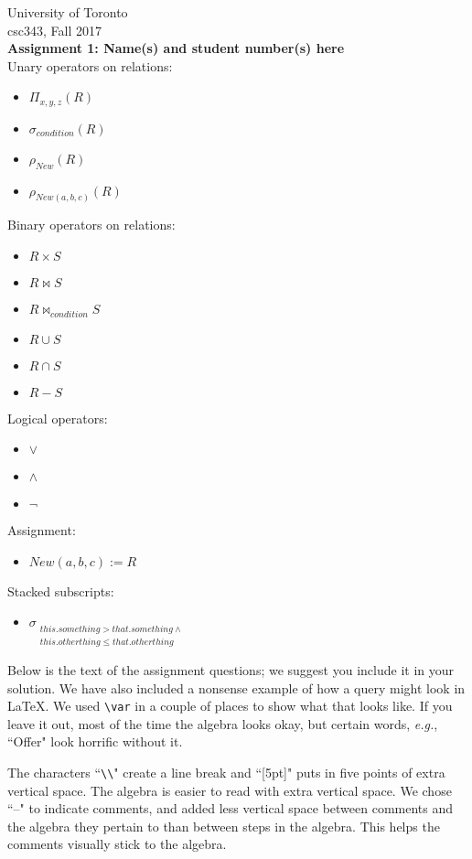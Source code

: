 \documentclass{article}
\newcommand{\var}[1]{\mathit{#1}}
\begin{document}
\noindent
University of Toronto\\
{\sc csc}343, Fall 2017\\[10pt]
{\LARGE\bf Assignment 1: Name(s) and student number(s) here} \\[10pt]

\noindent
Unary operators on relations:
\begin{itemize}
\item $\Pi_{x, y, z} (R)$
\item $\sigma_{condition} (R) $
\item $\rho_{New} (R) $
\item $\rho_{New(a, b, c)} (R) $
\end{itemize}
Binary operators on relations:
\begin{itemize}
\item $R \times S$
\item $R \bowtie S$
\item $R \bowtie_{condition} S$
\item $R \cup S$
\item $R \cap S$
\item $R - S$
\end{itemize}
Logical operators:
\begin{itemize}
\item $\vee$
\item $\wedge$
\item $\neg$
\end{itemize}
Assignment:
\begin{itemize}
\item $New(a, b, c) := R$
\end{itemize}
Stacked subscripts:
\begin{itemize}
\item
$\sigma_{\substack{this.something > that.something \wedge \\ this.otherthing \leq that.otherthing}}$
\end{itemize}

\noindent
Below is the text of the assignment questions; we suggest you include it in your solution.
We have also included a nonsense example of how a query might look in LaTeX.  
We used \verb|\var| in a couple of places to show what that looks like.  
If you leave it out, most of the time the algebra looks okay, but certain words,
{\it e.g.}, ``Offer" look horrific without it.

The characters ``\verb|\\|" create a line break and ``[5pt]" puts in 
five points of extra vertical space.  The algebra is easier to read with extra
vertical space.
We chose ``--" to indicate comments, and added less vertical space between comments
and the algebra they pertain to than between steps in the algebra.
This helps the comments visually stick to the algebra.
\end{document}
